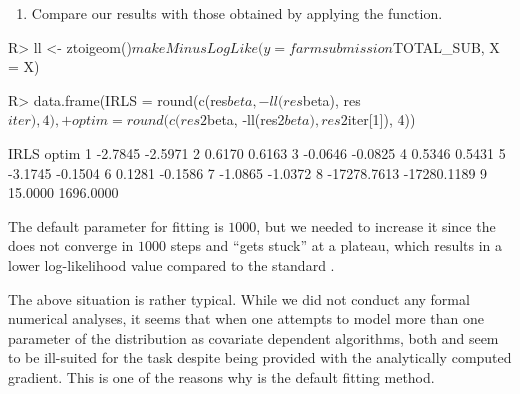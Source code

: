 \documentclass[nojss]{jss}
\providecommand{\tightlist}{%
  \setlength{\itemsep}{0pt}\setlength{\parskip}{0pt}}
\newcommand{\1}{\mathcal{I}} \newcommand{\bZero}{\boldsymbol{0}}
\begin{document}
\begin{enumerate}
\def\labelenumi{\arabic{enumi}.}
\setcounter{enumi}{4}
\tightlist
\item
  Compare our results with those obtained by applying the
   function.
\end{enumerate}

\begin{CodeChunk}
\begin{CodeInput}
R> ll <- ztoigeom()$makeMinusLogLike(y = farmsubmission$TOTAL_SUB, X = X)
\end{CodeInput}
\end{CodeChunk}

\begin{CodeChunk}
\end{CodeChunk}

\begin{CodeChunk}
\begin{CodeInput}
R> data.frame(IRLS  = round(c(res$beta, -ll(res$beta), res$iter), 4),
+            optim = round(c(res2$beta, -ll(res2$beta), res2$iter[1]), 4))
\end{CodeInput}
\begin{CodeOutput}
         IRLS       optim
1     -2.7845     -2.5971
2      0.6170      0.6163
3     -0.0646     -0.0825
4      0.5346      0.5431
5     -3.1745     -0.1504
6      0.1281     -0.1586
7     -1.0865     -1.0372
8 -17278.7613 -17280.1189
9     15.0000   1696.0000
\end{CodeOutput}
\end{CodeChunk}

The default  parameter for  fitting is
\(1000\), but we needed to increase it since the  does not
converge in \(1000\) steps and ``gets stuck'' at a plateau, which
results in a lower log-likelihood value compared to the standard
.

The above situation is rather typical. While we did not conduct any
formal numerical analyses, it seems that when one attempts to model more
than one parameter of the distribution as covariate dependent
 algorithms, both  and 
seem to be ill-suited for the task despite being provided with the
analytically computed gradient. This is one of the reasons why
 is the default fitting method.
\end{document}
